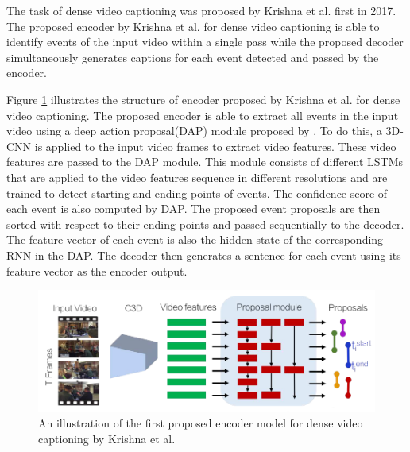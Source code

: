 \documentclass[preprint, 10pt]{elsarticle}
\begin{document}
		The task of dense video captioning was proposed by Krishna et al. \cite{krishna2017dense} first in 2017. The proposed encoder by Krishna et al. \cite{krishna2017dense} for dense video captioning is able to identify events of the input video within a single pass while the proposed decoder simultaneously generates captions for each event detected and passed by the encoder.
		
		Figure \ref{fig:dense1} illustrates the structure of encoder proposed by Krishna et al. \cite{krishna2017dense} for dense video captioning. The proposed encoder is able to extract all events in the input video using a deep action proposal(DAP) module proposed by \cite{escorcia2016daps}. To do this, a 3D-CNN is applied to the input video frames to extract video features. These video features are passed to the DAP module. This module consists of different LSTMs that are applied to the video features sequence in different resolutions and are trained to detect starting and ending points of events. The confidence score of each event is also computed by DAP. The proposed event proposals are then sorted with respect to their ending points and passed sequentially to the decoder. The feature vector of each event is also the hidden state of the corresponding RNN in the DAP. The decoder then generates a sentence for each event using its feature vector as the encoder output.
		
		\begin{figure}[h]
			\centering
			\includegraphics[scale=0.4]{Imgs/dense1.png}
			\caption{An illustration of the first proposed encoder model for dense video captioning by Krishna et al. \cite{krishna2017dense}}
			\label{fig:dense1}
		\end{figure}
	
\end{document}
